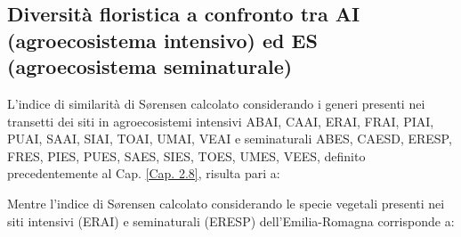 \documentclass[main.tex]{subfiles}
\begin{document}
\subsection{Diversità floristica a confronto tra AI (agroecosistema intensivo) ed ES (agroecosistema seminaturale)}

L’indice di similarità di Sørensen calcolato considerando i generi presenti nei transetti dei siti in agroecosistemi intensivi ABAI, CAAI, ERAI, FRAI, PIAI, PUAI, SAAI, SIAI, TOAI, UMAI, VEAI e seminaturali ABES, CAESD, ERESP, FRES, PIES, PUES, SAES, SIES, TOES, UMES, VEES, definito precedentemente al Cap. \ref{Cap. 2.8}, risulta pari a: 

\medskip

Mentre l’indice di Sørensen calcolato considerando le specie vegetali presenti nei siti intensivi (ERAI) e seminaturali (ERESP) dell’Emilia-Romagna corrisponde a:

\end{document}
